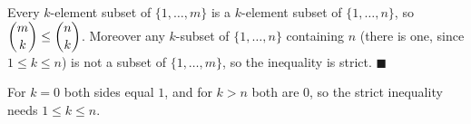 Every $k$-element subset of $\{1,\dots,m\}$ is a $k$-element subset of $\{1,\dots,n\}$, so $\dbinom mk\le\dbinom nk$. Moreover any $k$-subset of $\{1,\dots,n\}$ containing $n$ (there is one, since $1\le k\le n$) is not a subset of $\{1,\dots,m\}$, so the inequality is strict. $\blacksquare$

For $k=0$ both sides equal $1$, and for $k>n$ both are $0$, so the strict inequality needs $1\le k\le n$.
